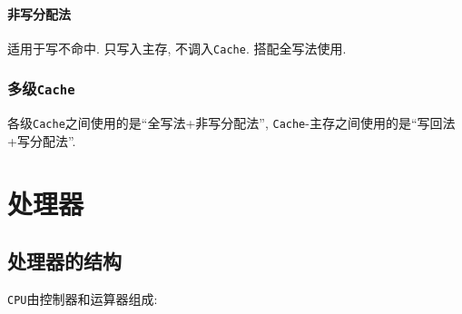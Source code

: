 \subsubsection{非写分配法}
适用于写不命中. 只写入主存, 不调入\verb|Cache|. 搭配全写法使用.
\subsection{多级\texttt{Cache}}
各级\verb|Cache|之间使用的是``全写法+非写分配法'', \verb|Cache|-主存之间使用的是``写回法+写分配法''.
\chapter{处理器}
\section{处理器的结构}
\verb|CPU|由控制器和运算器组成:
